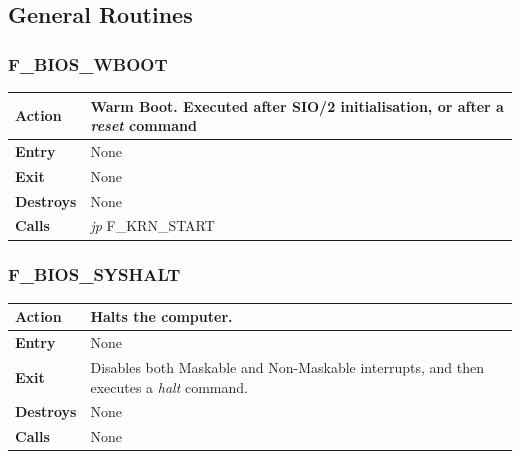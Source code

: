 \documentclass[a4paper,11pt]{article}
\begin{document}
    \subsection{General Routines}

        \subsubsection{F\_BIOS\_WBOOT}
        \label{func:fbioswboot}
        \begin{tabular}{l p{9cm}}
            \hline\textbf{Action}
            & Warm Boot. Executed after \textbf{SIO/2} initialisation, or after a
            \textit{reset} command \\
            \hline\textbf{Entry} & None \\
            \hline\textbf{Exit} & None \\
            \hline\textbf{Destroys} & None \\
            \hline\textbf{Calls} & \textit{jp} F\_KRN\_START \\
            \hline
        \end{tabular}

        \subsubsection{F\_BIOS\_SYSHALT}
        \label{func:fbiossyshalt}
        \begin{tabular}{l p{9cm}}
            \hline\textbf{Action}
            & Halts the computer.\\
            \hline\textbf{Entry} & None \\
            \hline\textbf{Exit} & Disables both Maskable and Non-Maskable
            interrupts, and then executes a \textit{halt} command.\\
            \hline\textbf{Destroys} & None \\
            \hline\textbf{Calls} & None \\
            \hline
        \end{tabular}
\end{document}
